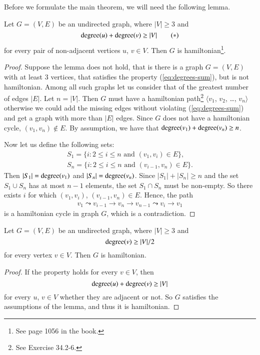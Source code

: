 \subproblem
Before we formulate the main theorem, we will need the following lemma.
\begin{lemma}
    Let $G=(V,E)$ be an undirected graph, where $|V|\ge3$ and
    \begin{equation} \label{eq:degrees-sum}
        \operatorname{degree}(u)+\operatorname{degree}(v) \ge |V| \tag{$*$}
    \end{equation}
    for every pair of non-adjacent vertices $u$, $v\in V$.
    Then $G$ is hamiltonian\footnote{See page 1056 in the book.}.
\end{lemma}

\begin{proof}
    Suppose the lemma does not hold, that is there is a graph $G=(V,E)$ with at least 3 vertices, that satisfies the property (\ref{eq:degrees-sum}), but is not hamiltonian.
    Among all such graphs let us consider that of the greatest number of edges $|E|$.
    Let $n=|V|$.
    Then $G$ must have a hamiltonian path\footnote{See Exercise 34.2-6.} $\langle v_1$, $v_2$, \dots, $v_n\rangle$\dash otherwise we could add the missing edges without violating (\ref{eq:degrees-sum}) and get a graph with more than $|E|$ edges.
    Since $G$ does not have a hamiltonian cycle, $(v_1,v_n)\notin E$.
    By assumption, we have that $\operatorname{degree}(v_1)+\operatorname{degree}(v_n)\ge n$.

    Now let us define the following sets:
    \begin{gather*}
        S_1 = \{i: 2\le i\le n \text{ and } (v_1,v_i)\in E\}, \\
        S_n = \{i: 2\le i\le n \text{ and } (v_{i-1},v_n)\in E\}.
    \end{gather*}
    Then $|S_1|=\operatorname{degree}(v_1)$ and $|S_n|=\operatorname{degree}(v_n)$.
    Since $|S_1|+|S_n|\ge n$ and the set $S_1\cup S_n$ has at most $n-1$ elements, the set $S_1\cap S_n$ must be non-empty.
    So there exists $i$ for which $(v_1,v_i)$, $(v_{i-1},v_n)\in E$.
    Hence, the path
    \begin{align*}
        v_1\leadsto v_{i-1}\to v_n\to v_{n-1}\leadsto v_i\to v_1
    \end{align*}
    is a hamiltonian cycle in graph $G$, which is a contradiction.
\end{proof}

\begin{theorem}
    Let $G=(V,E)$ be an undirected graph, where $|V|\ge3$ and
    \[
        \operatorname{degree}(v) \ge |V|/2
    \]
    for every vertex $v\in V$.
    Then $G$ is hamiltonian.
\end{theorem}

\begin{proof}
    If the property holds for every $v\in V$, then
    \[
        \operatorname{degree}(u)+\operatorname{degree}(v) \ge |V|
    \]
    for every $u$, $v\in V$ whether they are adjacent or not.
    So $G$ satisfies the assumptions of the lemma, and thus it is hamiltonian.
\end{proof}
